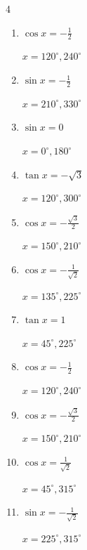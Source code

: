\begin{multicols}{4}
\begin{enumerate}
        $\displaystyle x = 60^{\circ} , 120^{\circ}$

  \item $\displaystyle \cos{x}  = -\frac{1}{2}$

        $\displaystyle x = 120^{\circ} , 240^{\circ}$

  \item $\displaystyle \sin{x}  = -\frac{1}{2}$

        $\displaystyle x = 210^{\circ} , 330^{\circ}$

  \item $\displaystyle \sin{x}  = 0$

        $\displaystyle x = 0^{\circ} , 180^{\circ}$

  \item $\displaystyle \tan{x}  = -\sqrt{3}$

        $\displaystyle x = 120^{\circ} , 300^{\circ}$

  \item $\displaystyle \cos{x}  = -\frac{\sqrt{3}}{2}$

        $\displaystyle x = 150^{\circ} , 210^{\circ}$

  \item $\displaystyle \cos{x}  = -\frac{1}{\sqrt{2}}$

        $\displaystyle x = 135^{\circ} , 225^{\circ}$

  \item $\displaystyle \tan{x}  = 1$

        $\displaystyle x = 45^{\circ} , 225^{\circ}$

  \item $\displaystyle \cos{x}  = -\frac{1}{2}$

        $\displaystyle x = 120^{\circ} , 240^{\circ}$

  \item $\displaystyle \cos{x}  = -\frac{\sqrt{3}}{2}$

        $\displaystyle x = 150^{\circ} , 210^{\circ}$

  \item $\displaystyle \cos{x}  = \frac{1}{\sqrt{2}}$

        $\displaystyle x = 45^{\circ} , 315^{\circ}$

\columnbreak %

  \item $\displaystyle \sin{x}  = -\frac{1}{\sqrt{2}}$

        $\displaystyle x = 225^{\circ} , 315^{\circ}$


\end{enumerate}
\end{multicols}
